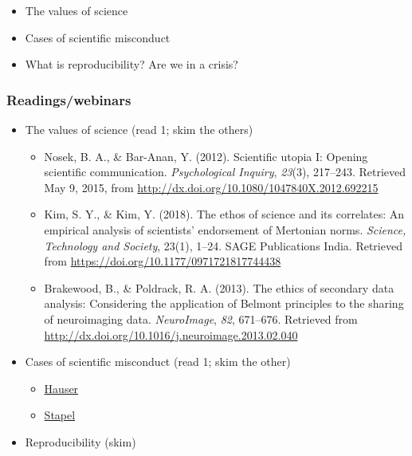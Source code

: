 \documentclass[
]{article}
\providecommand{\tightlist}{%
  \setlength{\itemsep}{0pt}\setlength{\parskip}{0pt}}
\begin{document}
\begin{itemize}
\tightlist
\item
  The values of science
\item
  Cases of scientific misconduct
\item
  What is reproducibility? Are we in a crisis?
\end{itemize}

\hypertarget{readingswebinars}{%
\subsubsection{Readings/webinars}\label{readingswebinars}}

\begin{itemize}
\tightlist
\item
  The values of science (read 1; skim the others)

  \begin{itemize}
  \tightlist
  \item
    Nosek, B. A., \& Bar-Anan, Y. (2012). Scientific utopia I: Opening
    scientific communication. \emph{Psychological Inquiry},
    \emph{23}(3), 217--243. Retrieved May 9, 2015, from
    \url{http://dx.doi.org/10.1080/1047840X.2012.692215}
  \item
    Kim, S. Y., \& Kim, Y. (2018). The ethos of science and its
    correlates: An empirical analysis of scientists' endorsement of
    Mertonian norms. \emph{Science, Technology and Society}, 23(1),
    1--24. SAGE Publications India. Retrieved from
    \url{https://doi.org/10.1177/0971721817744438}
  \item
    Brakewood, B., \& Poldrack, R. A. (2013). The ethics of secondary
    data analysis: Considering the application of Belmont principles to
    the sharing of neuroimaging data. \emph{NeuroImage}, \emph{82},
    671--676. Retrieved from
    \url{http://dx.doi.org/10.1016/j.neuroimage.2013.02.040}
  \end{itemize}
\item
  Cases of scientific misconduct (read 1; skim the other)

  \begin{itemize}
  \tightlist
  \item
    \href{http://www.sciencemag.org/news/2012/09/harvard-psychology-researcher-committed-fraud-us-investigation-concludes}{Hauser}
  \item
    \href{http://www.nytimes.com/2013/04/28/magazine/diederik-stapels-audacious-academic-fraud.html?pagewanted=all\&_r=0}{Stapel}
  \end{itemize}
\item
  Reproducibility (skim)


\end{itemize}
\end{document}
